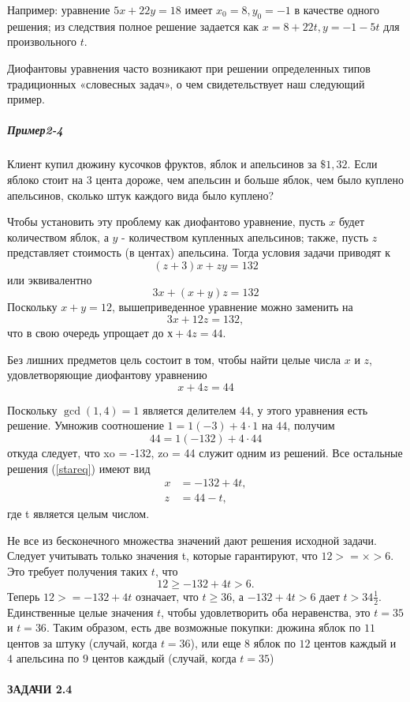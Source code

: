 \documentclass[11pt]{article}
\begin{document}
\qquad Например: уравнение $5x + 22y = 18$ имеет $x_0 = 8, y_0 = -1$ в качестве одного решения; из следствия полное решение задается как $x = 8 + 22t, y = -1-5t$ для произвольного $t$.

\qquad Диофантовы уравнения часто возникают при решении определенных типов традиционных «словесных задач», о чем свидетельствует наш следующий пример.

\subparagraph{Пример2-4}
Клиент купил дюжину кусочков фруктов, яблок и апельсинов за $\$1,32$. Если яблоко стоит на 3 цента дороже, чем апельсин и больше яблок, чем было куплено апельсинов, сколько штук каждого вида было куплено?

\qquad Чтобы установить эту проблему как диофантово уравнение, пусть $x$ будет количеством яблок, а $y$ - количеством купленных апельсинов; также, пусть $z$ представляет стоимость (в центах) апельсина. Тогда условия задачи приводят к
\[(z+3)x + zy = 132\]
или эквивалентно
\[3x + (x + y)z = 132\]
Поскольку $x + y = 12$, вышеприведенное уравнение можно заменить на
\[3x + 12z = 132,\]
что в свою очередь упрощает до $х + 4z = 44$.

Без лишних предметов цель состоит в том, чтобы найти целые числа $x$ и $z$, удовлетворяющие диофантову уравнению
\begin{equation*}
x+4z=44
\tag{*}
\label{stareq}
\end{equation*}

Поскольку $\gcd(1, 4) = 1$ является делителем $44$, у этого уравнения есть решение. Умножив соотношение $1 = 1 (-3) + 4 · 1$ на $44$, получим
\[44 = 1 (-132) + 4 \cdot 44\]
откуда следует, что xo = -132, zo = 44 служит одним из решений. Все остальные решения (\ref{stareq}) имеют вид
\[\begin{split}
	x & = -132 + 4t,\\
	z & = 44 - t,
\end{split}\]
где t является целым числом.

Не все из бесконечного множества значений дают решения исходной задачи. Следует учитывать только значения t, которые гарантируют, что $12 > = × > 6$. Это требует получения таких $t$, что
\[12 \geq -132 + 4t > 6.\]
Теперь $12> = - 132 + 4t$ означает, что $t \geq 36$, а $-132 + 4t> 6$ дает $t > 34 \frac{1}{2}$. Единственные целые значения $t$, чтобы удовлетворить оба неравенства, это $t = 35$ и $t = 36$. Таким образом, есть две возможные покупки: дюжина яблок по $11$ центов за штуку (случай, когда $t = 36$), или еще $8$ яблок по $12$ центов каждый и $4$ апельсина по $9$ центов каждый (случай, когда $t = 35$)
\begin{center}
	\item \paragraph{ЗАДАЧИ 2.4}
\end{center}
\end{document}
